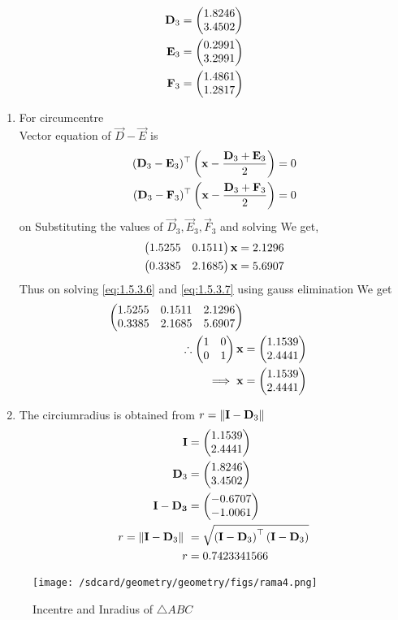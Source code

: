 \documentclass[11pt]{book}
\begin{document}
\begin{enumerate}[label=\thesection.\arabic*.,ref=\thesection.\theenumi]
\begin{align}
    \mathbf{D}_3 &= \begin{pmatrix}1.8246  \\ 3.4502\end{pmatrix} \\
    \mathbf{E}_3 &= \begin{pmatrix}0.2991  \\ 3.2991\end{pmatrix} \\
    \mathbf{F}_3 &= \begin{pmatrix}1.4861  \\ 1.2817\end{pmatrix} 
\end{align}
\begin{enumerate}
\item For circumcentre \\
Vector equation of $\vec{D}-\vec{E}$ is
\begin{align}
	(\mathbf{D}_3-\mathbf{E}_3)^\top\left( \mathbf{x} - \frac{\mathbf{D}_3+\mathbf{E}_3}{2}\right) = 0 \\
(\mathbf{D}_3-\mathbf{F}_3)^\top\left( \mathbf{x} - \frac{\mathbf{D}_3+\mathbf{F}_3}{2}\right) = 0
\end{align}
on Substituting the values of $\vec{D}_3, \vec{E}_3, \vec{F}_3$ and solving We get,
\begin{align}
     \myvec{1.5255 & 0.1511}\vec{x} &= 2.1296 \label{eq:1.5.3.6} \\
     \myvec{0.3385 & 2.1685}\vec{x} &= 5.6907 \label{eq:1.5.3.7}
\end{align}
Thus on solving \eqref{eq:1.5.3.6} and \eqref{eq:1.5.3.7} using gauss elimination We get
\begin{align}
    \begin{pmatrix} 1.5255 & 0.1511 &2.1296 \\ 0.3385 & 2.1685& 5.6907\end{pmatrix} \\
    \therefore \begin{pmatrix}1&0\\0&1\end{pmatrix}\mathbf{x} &= \begin{pmatrix}1.1539 \\ 2.4441\end{pmatrix}\\
\implies \mathbf{x}&=\begin{pmatrix}1.1539 \\ 2.4441\end{pmatrix}
\end{align}
\item The circiumradius is obtained from  $ r=\left\lVert\mathbf{I}-\mathbf{D}_3\right\rVert$
   \begin{align}
       \vec{I} &= \myvec{1.1539 \\ 2.4441} \\
       \vec{D}_3 &= \myvec{1.8246  \\ 3.4502} \\
       \vec{I - D_3} &= \myvec{-0.6707 \\-1.0061} \\
 r= \norm{\vec{I}-\vec{D}_3}\ &=  \sqrt{\brak{\vec{I}-\vec{D}_3}^{\top}\brak{\vec{I}-\vec{D}_3}} \\
 r &= 0.7423341566
   \end{align}
\end{enumerate}
\begin{figure}[H]
\texttt{[image: /sdcard/geometry/geometry/figs/rama4.png]}
\caption{Incentre and Inradius of $\triangle ABC$}
\label{fig:fig2}
\end{figure}


\end{enumerate}
\end{document}
